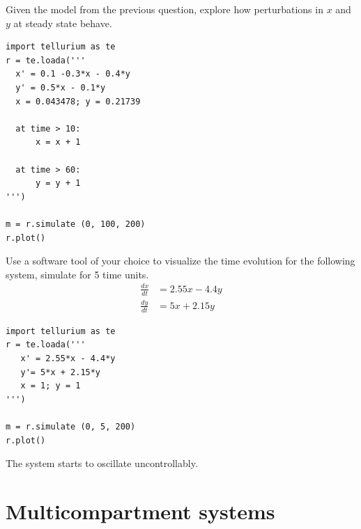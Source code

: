 \documentclass[12pt]{article}
\begin{document}
\begin{question}
Given the model from the previous question, explore how perturbations in $x$ and $y$ at steady state behave.
\end{question}
\cprotEnv\begin{solution}
\begin{verbatim}
import tellurium as te
r = te.loada('''
  x' = 0.1 -0.3*x - 0.4*y
  y' = 0.5*x - 0.1*y
  x = 0.043478; y = 0.21739

  at time > 10:
      x = x + 1

  at time > 60:
      y = y + 1
''')

m = r.simulate (0, 100, 200)
r.plot()
\end{verbatim}

\end{solution}




\begin{question}
Use a software tool of your choice to visualize the time evolution for the following system, simulate for 5 time units.
%
\begin{align*}
\frac{dx}{dt} &= 2.55 x - 4.4 y \\[5pt]
\frac{dy}{dt} &= 5 x + 2.15 y
\end{align*}
\end{question}
\cprotEnv\begin{solution}
\begin{verbatim}
import tellurium as te
r = te.loada('''
   x' = 2.55*x - 4.4*y
   y'= 5*x + 2.15*y
   x = 1; y = 1
''')

m = r.simulate (0, 5, 200)
r.plot()
\end{verbatim}

The system starts to oscillate uncontrollably.
\end{solution}




\section{Multicompartment systems}
\end{document}
